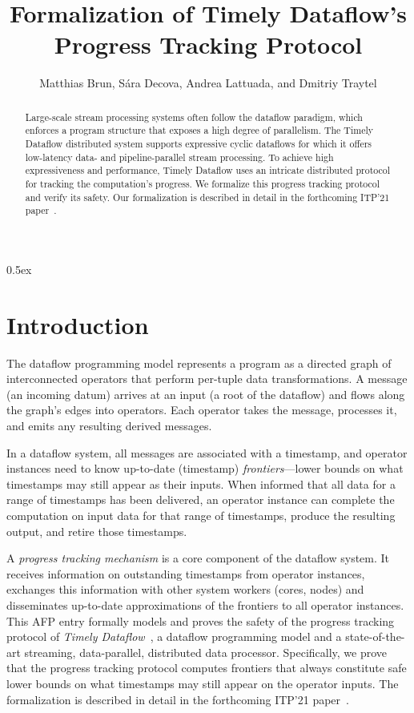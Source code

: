 \documentclass[11pt,a4paper]{article}
\begin{document}
\title{Formalization of Timely Dataflow's\\ Progress Tracking Protocol}
\author{Matthias Brun, S\'ara Decova, Andrea Lattuada, and Dmitriy Traytel}

\maketitle

\begin{abstract}
Large-scale stream processing systems often follow the dataflow paradigm, which enforces a program
structure that exposes a high degree of parallelism. The Timely Dataflow distributed system supports
expressive cyclic dataflows for which it offers low-latency data- and pipeline-parallel stream processing.
To achieve high expressiveness and performance, Timely Dataflow uses an intricate distributed protocol
for tracking the computation’s progress. We formalize this progress tracking protocol and verify its safety.
Our formalization is described in detail in the forthcoming ITP'21 paper~\cite{BrunDLT-ITP21}.
\end{abstract}

\tableofcontents

\parindent 0pt\parskip 0.5ex

\section{Introduction}

The dataflow programming model represents a program as a directed graph of interconnected operators
that perform per-tuple data transformations. A message (an incoming datum) arrives at an input (a
root of the dataflow) and flows along the graph's edges into operators. Each operator takes the
message, processes it, and emits any resulting derived messages.

In a dataflow system, all messages are associated with a timestamp, and operator instances need to
know up-to-date (timestamp) \textit{frontiers}---lower bounds on what timestamps may still appear as
their inputs. When informed that all data for a range of timestamps has been delivered, an operator
instance can complete the computation on input data for that range of timestamps, produce the
resulting output, and retire those timestamps.

A \textit{progress tracking mechanism} is a core component of the dataflow system. It receives
information on outstanding timestamps from operator instances, exchanges this information with other
system workers (cores, nodes) and disseminates up-to-date approximations of the frontiers to all
operator instances. This AFP entry formally models and proves the safety of the progress
tracking protocol of \textit{Timely
Dataflow}~\cite{DBLP:conf/sosp/MurrayMIIBA13,URL:timely-dataflow}, a dataflow programming
model and a state-of-the-art streaming, data-parallel, distributed data processor.
Specifically, we
prove that the progress tracking protocol computes frontiers that always constitute safe lower bounds on what
timestamps may still appear on the operator inputs.
The formalization is described in detail in the forthcoming ITP'21 paper~\cite{BrunDLT-ITP21}.
\end{document}
